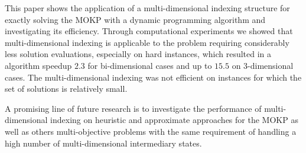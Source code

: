 This paper shows
the application of a multi-dimensional indexing structure
for exactly solving the MOKP with a dynamic programming algorithm
and investigating its efficiency.
Through computational experiments we showed that multi-dimensional indexing
is applicable to the problem requiring considerably less solution evaluations,
especially on hard instances,
which resulted in a algorithm speedup $2.3$ for bi-dimensional
cases and up to $15.5$ on 3-dimensional cases.
The multi-dimensional indexing was not efficient on instances for which the set of solutions
is relatively small.

A promising line of future research is to investigate the performance
of multi-dimensional indexing on heuristic and approximate approaches
for the MOKP as well as others multi-objective problems
with the same requirement of handling a high number of multi-dimensional
intermediary states.

